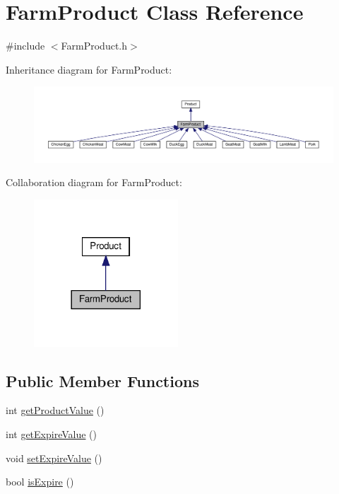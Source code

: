 \hypertarget{classFarmProduct}{}\section{Farm\+Product Class Reference}
\label{classFarmProduct}


{\ttfamily \#include $<$Farm\+Product.\+h$>$}



Inheritance diagram for Farm\+Product\+:
\nopagebreak
\begin{figure}[H]
\begin{center}
\leavevmode
\includegraphics[width=350pt]{classFarmProduct__inherit__graph}
\end{center}
\end{figure}


Collaboration diagram for Farm\+Product\+:
\nopagebreak
\begin{figure}[H]
\begin{center}
\leavevmode
\includegraphics[width=153pt]{classFarmProduct__coll__graph}
\end{center}
\end{figure}
\subsection*{Public Member Functions}
\begin{DoxyCompactItemize}
\item 
int \hyperlink{classFarmProduct_ae169937bd043517efa0a05be844aaa35}{get\+Product\+Value} ()
\item 
int \hyperlink{classFarmProduct_a2a7526789b3ab01a8fda7773aa2c0565}{get\+Expire\+Value} ()
\item 
void \hyperlink{classFarmProduct_aea484f8f23984c14e0014fa7c35b9629}{set\+Expire\+Value} ()
\item 
bool \hyperlink{classFarmProduct_a18cb875372c4e24ef79615bcd47a110e}{is\+Expire} ()
\end{DoxyCompactItemize}
